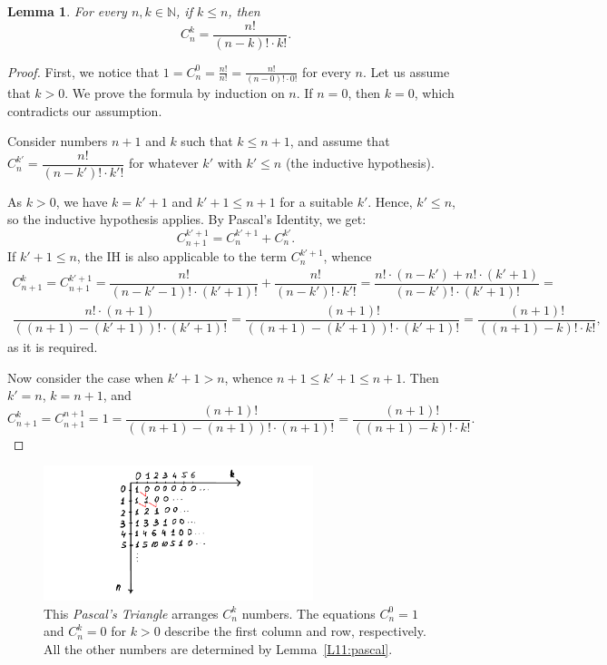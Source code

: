 \documentclass[12pt,notitlepage]{article}
\theoremstyle{plain}
\newtheorem{lemma}[thm]{Lemma}
\theoremstyle{definition}
\theoremstyle{plain}
\newcommand{\N}{\mathbb{N}}
\newcommand{\1}{\mathbf{1}}
\newcommand{\0}{\mathbf{0}}
\begin{document}
\begin{lemma}
For every $n, k \in \N$, if $k \leq n$, then
$$C_n^k = \dfrac{n!}{(n-k)! \cdot k!}.$$
\end{lemma}
\begin{proof}
First, we notice that $1 = C_n^0 = \frac{n!}{n!} = \frac{n!}{(n - 0)! \cdot 0!}$ for every $n$. Let us assume that $k > 0$. We prove the formula by induction on $n$. If $n = 0$, then $k = 0$, which contradicts our assumption.

Consider numbers $n + 1$ and $k$ such that $k \leq n + 1$, and assume that $C_n^{k'} = \dfrac{n!}{(n-k')! \cdot k'!}$ for whatever $k'$ with $k' \leq n$ (the inductive hypothesis).

As $k > 0$, we have $k = k' + 1$ and $k' + 1 \leq n + 1$ for a suitable $k'$. Hence, $k' \leq n$, so the inductive hypothesis applies. By Pascal's Identity, we get:
$$C_{n + 1}^{k' + 1} = C_n^{k' + 1} + C_n^{k'}.$$
If $k' + 1 \leq n$, the IH is also applicable to the term $C_n^{k' + 1}$, whence
\begin{multline*}
C_{n+1}^k = C_{n + 1}^{k' + 1} = \dfrac{n!}{(n-k'-1)! \cdot (k'+1)!} + \dfrac{n!}{(n-k')! \cdot k'!} =
 \dfrac{n!\cdot (n - k') + n! \cdot (k' + 1)}{(n-k')! \cdot (k'+1)!} =\\
  \dfrac{n!\cdot (n + 1)}{((n+1)-(k'+1))! \cdot (k'+1)!} = \dfrac{(n + 1)!}{((n+1)-(k'+1))! \cdot (k'+1)!} = \dfrac{(n + 1)!}{((n+1)-k)! \cdot k!},
\end{multline*}
as it is required.

Now consider the case when $k' + 1 > n$, whence $n + 1 \leq k' + 1 \leq n + 1$. Then $k' = n$, $k = n + 1$, and
$$C_{n+1}^k =  C_{n+1}^{n+1} = 1 = \dfrac{(n + 1)!}{((n+1)-(n+1))! \cdot (n+1)!} = \dfrac{(n + 1)!}{((n+1)-k)! \cdot k!} .$$
\end{proof}

\begin{figure}[h]
\centering
\includegraphics*[width=0.7\textwidth]{pascal_triang.pdf}
\caption{This \emph{Pascal's Triangle} arranges $C_n^k$ numbers. The equations $C_n^0 = 1$ and $C_n^k = 0$ for $k > 0$ describe the first column and row, respectively. All the other
numbers are determined by Lemma~\ref{L11:pascal}.}
\end{figure}
\end{document}
